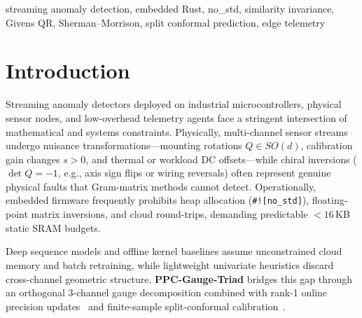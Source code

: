 \documentclass[conference]{IEEEtran}
\begin{document}
\begin{IEEEkeywords}
streaming anomaly detection, embedded Rust, no\_std, similarity invariance, Givens QR, Sherman--Morrison, split conformal prediction, edge telemetry
\end{IEEEkeywords}

\section{Introduction}
Streaming anomaly detectors deployed on industrial microcontrollers, physical sensor nodes, and low-overhead telemetry agents face a stringent intersection of mathematical and systems constraints. Physically, multi-channel sensor streams undergo nuisance transformations---mounting rotations $Q \in SO(d)$, calibration gain changes $s > 0$, and thermal or workload DC offsets---while chiral inversions ($\det Q = -1$, e.g., axis sign flips or wiring reversals) often represent genuine physical faults that Gram-matrix methods cannot detect. Operationally, embedded firmware frequently prohibits heap allocation (\texttt{\#![no\_std]}), floating-point matrix inversions, and cloud round-trips, demanding predictable $<16$\,KB static SRAM budgets.

Deep sequence models and offline kernel baselines assume unconstrained cloud memory and batch retraining, while lightweight univariate heuristics discard cross-channel geometric structure. \textbf{PPC-Gauge-Triad} bridges this gap through an orthogonal 3-channel gauge decomposition combined with rank-1 online precision updates~\cite{sherman1950} and finite-sample split-conformal calibration~\cite{vovk2005conformal}.
\end{document}
